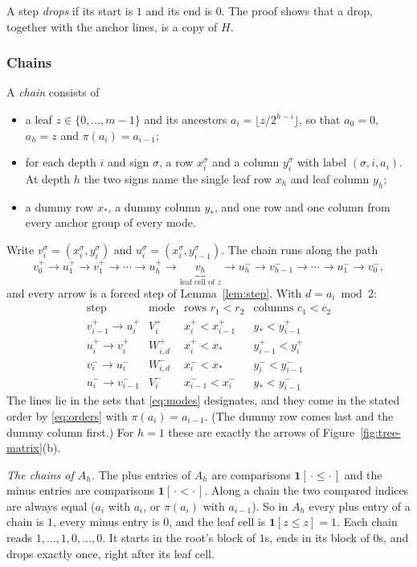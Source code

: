 \documentclass{article}
\theoremstyle{plain}
\theoremstyle{definition}
\begin{document}
A step \emph{drops} if its start is $1$ and its end is $0$. The proof shows
that a drop, together with the anchor lines, is a copy of $H$.

\subsubsection*{Chains}

A \emph{chain} consists of
\begin{itemize}\itemsep1pt
\item a leaf $z\in\{0,\dots,m-1\}$ and its ancestors $a_i=\lfloor z/2^{h-i}\rfloor$,
  so that $a_0=0$, $a_h=z$ and $\pi(a_i)=a_{i-1}$;
\item for each depth $i$ and sign $\sigma$, a row $x_i^\sigma$ and a column
  $y_i^\sigma$ with label $(\sigma,i,a_i)$. At depth $h$ the two signs name the
  single leaf row $x_h$ and leaf column $y_h$;
\item a dummy row $x_*$, a dummy column $y_*$, and one row and one column from
  every anchor group of every mode.
\end{itemize}
Write $v_i^\sigma=(x_i^\sigma,y_i^\sigma)$ and
$u_i^\sigma=(x_i^\sigma,y_{i-1}^\sigma)$. The chain runs along the path
\[
  v_0^+\to u_1^+\to v_1^+\to\cdots\to u_h^+\to
  \underbrace{v_h}_{\text{leaf cell of }z}
  \to u_h^-\to v_{h-1}^-\to\cdots\to u_1^-\to v_0^- ,
\]
and every arrow is a forced step of Lemma~\ref{lem:step}. With $d=a_i\bmod 2$:
\[
\begin{array}{llll}
  \text{step} & \text{mode} & \text{rows } r_1<r_2 & \text{columns } c_1<c_2\\[2pt]
  v_{i-1}^+\to u_i^+ & V_i^+ & x_i^+<x_{i-1}^+ & y_*<y_{i-1}^+\\
  u_i^+\to v_i^+ & W_{i,d}^+ & x_i^+<x_* & y_{i-1}^+<y_i^+\\
  v_i^-\to u_i^- & W_{i,d}^- & x_i^-<x_* & y_i^-<y_{i-1}^-\\
  u_i^-\to v_{i-1}^- & V_i^- & x_{i-1}^-<x_i^- & y_*<y_{i-1}^-
\end{array}
\]
The lines lie in the sets that \eqref{eq:modes} designates, and they come in the
stated order by \eqref{eq:orders} with $\pi(a_i)=a_{i-1}$. (The dummy row
comes last and the dummy column first.) For $h=1$ these are exactly the arrows
of Figure~\ref{fig:tree-matrix}(b).

\emph{The chains of $A_h$.} The plus entries of $A_h$ are comparisons
$\mathbf 1[\,\cdot\le\cdot\,]$ and the minus entries are comparisons
$\mathbf 1[\,\cdot<\cdot\,]$. Along a chain the two compared indices are always
equal ($a_i$ with $a_i$, or $\pi(a_i)$ with $a_{i-1}$). So in $A_h$ every plus
entry of a chain is $1$, every minus entry is $0$, and the leaf cell is
$\mathbf 1[z\le z]=1$. Each chain reads $1,\dots,1,0,\dots,0$. It starts in the
root's block of $1$s, ends in its block of $0$s, and drops exactly once, right
after its leaf cell.
\end{document}
